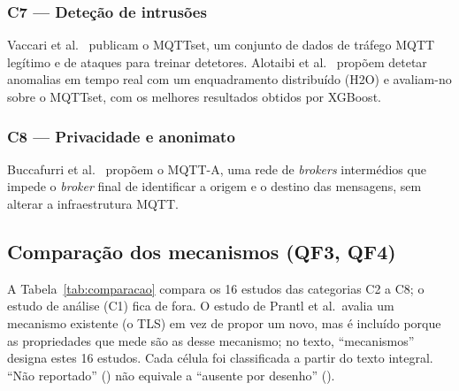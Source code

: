 \subsubsection{C7 --- Deteção de intrusões}

Vaccari et al.~\cite{vaccari2020mqttset} publicam o MQTTset, um conjunto de dados
de tráfego MQTT legítimo e de ataques para treinar detetores. Alotaibi et
al.~\cite{alotaibi2024secure} propõem detetar anomalias em tempo real com um
enquadramento distribuído (H2O) e avaliam-no sobre o MQTTset, com os melhores
resultados obtidos por XGBoost.

\subsubsection{C8 --- Privacidade e anonimato}

Buccafurri et al.~\cite{buccafurri2023mqtta} propõem o MQTT-A, uma rede de
\emph{brokers} intermédios que impede o \emph{broker} final de identificar a origem
e o destino das mensagens, sem alterar a infraestrutura MQTT.

\subsection{Comparação dos mecanismos (QF3, QF4)}
\label{sec:comparacao}

A Tabela~\ref{tab:comparacao} compara os 16 estudos das categorias C2 a C8; o
estudo de análise (C1) fica de fora. O estudo de Prantl et al.\ avalia um mecanismo
existente (o TLS) em vez de propor um novo, mas é incluído porque as propriedades
que mede são as desse mecanismo; no texto, \enquote{mecanismos} designa estes 16
estudos. Cada célula foi
classificada a partir do texto integral.
\enquote{Não reportado} (\Nr) não equivale a \enquote{ausente por desenho}
(\Nao).

